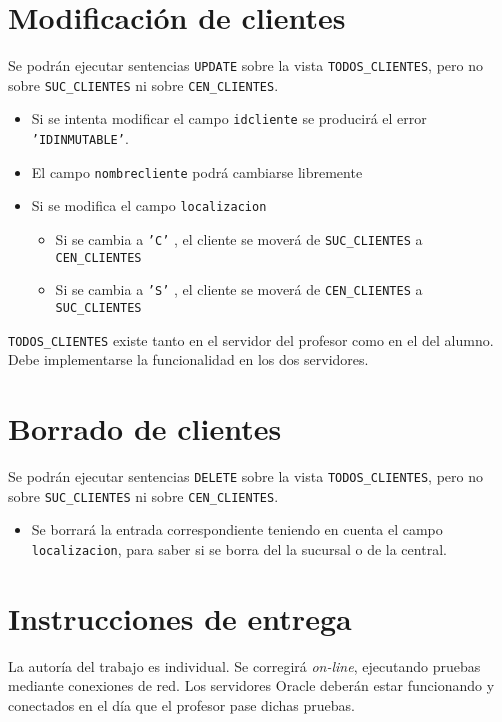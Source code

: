 \documentclass[a4paper]{article}
\begin{document}
\section{Modificación de clientes}
\label{sec:org0000015}
Se podrán ejecutar sentencias \texttt{UPDATE} sobre la vista \texttt{TODOS\_CLIENTES}, pero no sobre \texttt{SUC\_CLIENTES} ni sobre \texttt{CEN\_CLIENTES}.
\begin{itemize}
\item Si se intenta modificar el campo \texttt{idcliente} se producirá el error \texttt{'IDINMUTABLE'}.
\item El campo \texttt{nombrecliente} podrá cambiarse libremente
\item Si se modifica el campo \texttt{localizacion}
\begin{itemize}
\item Si se cambia a \texttt{'C'} , el cliente se moverá de \texttt{SUC\_CLIENTES} a \texttt{CEN\_CLIENTES}
\item Si se cambia a \texttt{'S'} , el cliente se moverá de \texttt{CEN\_CLIENTES} a \texttt{SUC\_CLIENTES}
\end{itemize}
\end{itemize}

\begin{Aviso}
\texttt{TODOS\_CLIENTES} existe tanto en el servidor del profesor como en el del alumno. Debe implementarse la funcionalidad en los dos servidores.
\end{Aviso}

\section{Borrado de clientes}
\label{sec:org0000018}
Se podrán ejecutar sentencias \texttt{DELETE} sobre la vista \texttt{TODOS\_CLIENTES}, pero no sobre \texttt{SUC\_CLIENTES} ni sobre \texttt{CEN\_CLIENTES}.
\begin{itemize}
\item Se borrará la entrada correspondiente teniendo en cuenta el campo \texttt{localizacion}, para saber si se borra del la sucursal o de la central.
\end{itemize}

\section{Instrucciones de entrega}
\label{sec:org000001b}
La autoría del trabajo es individual. Se corregirá \emph{on-line}, ejecutando pruebas mediante conexiones de red. Los servidores Oracle deberán estar funcionando y conectados en el día que el profesor pase dichas pruebas.
\end{document}
